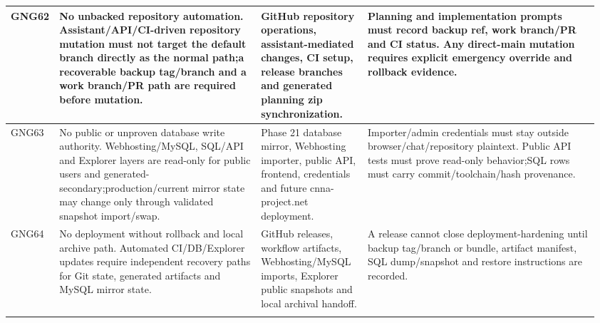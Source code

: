 \begin{longtable}{L{0.045\linewidth} L{0.345\linewidth} L{0.185\linewidth} L{0.39\linewidth}}
\hline
\addlinespace[0.24em]
GNG62 & No unbacked repository automation. Assistant/\allowbreak{}API/\allowbreak{}CI-driven repository mutation must not target the default branch directly as the normal path;\newline a recoverable backup tag/\allowbreak{}branch and a work branch/\allowbreak{}PR path are required before mutation. & GitHub repository operations, assistant-mediated changes, CI setup, release branches and generated planning zip synchronization. & Planning and implementation prompts must record backup ref, work branch/\allowbreak{}PR and CI status. Any direct-main mutation requires explicit emergency override and rollback evidence.\\
\hline
\addlinespace[0.24em]
GNG63 & No public or unproven database write authority. Webhosting/\allowbreak{}MySQL, SQL/\allowbreak{}API and Explorer layers are read-only for public users and generated-secondary;\newline production/\allowbreak{}current mirror state may change only through validated snapshot import/\allowbreak{}swap. & Phase 21 database mirror, Webhosting importer, public API, frontend, credentials and future cnna-project.net deployment. & Importer/\allowbreak{}admin credentials must stay outside browser/\allowbreak{}chat/\allowbreak{}repository plaintext. Public API tests must prove read-only behavior;\newline SQL rows must carry commit/\allowbreak{}toolchain/\allowbreak{}hash provenance.\\
\hline
\addlinespace[0.24em]
GNG64 & No deployment without rollback and local archive path. Automated CI/\allowbreak{}DB/\allowbreak{}Explorer updates require independent recovery paths for Git state, generated artifacts and MySQL mirror state. & GitHub releases, workflow artifacts, Webhosting/\allowbreak{}MySQL imports, Explorer public snapshots and local archival handoff. & A release cannot close deployment-hardening until backup tag/\allowbreak{}branch or bundle, artifact manifest, SQL dump/\allowbreak{}snapshot and restore instructions are recorded.\\
\hline
\addlinespace[0.24em]

\end{longtable}
